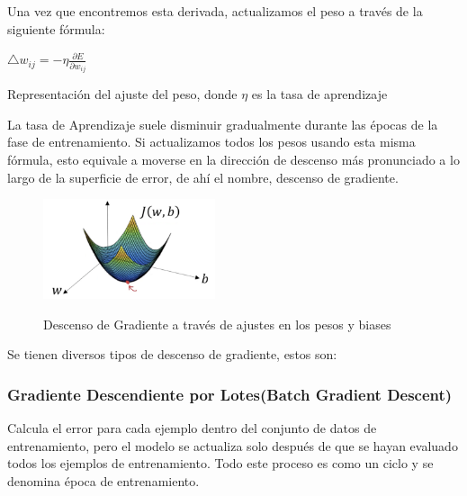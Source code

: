 		Una vez que encontremos esta derivada, actualizamos el peso a través de la siguiente fórmula:

		\begingroup\makeatletter{}\check@mathfonts
		\begin{center}
		$  \triangle w_{ij} = -\eta\frac{{\partial E}}{\partial w_{ij}} $
		\end{center}
		\begin{center}
		{\small{Representación del ajuste del peso, donde $\eta$ es la tasa de aprendizaje}}
		\end{center}
		\endgroup

		La tasa de Aprendizaje suele disminuir gradualmente durante las épocas de la fase de entrenamiento. Si actualizamos todos los pesos usando esta misma fórmula, esto equivale a moverse en la dirección de descenso más pronunciado a lo largo de la superficie de error, de ahí el nombre, descenso de gradiente.
		\begin{figure}[H]
		\begin{center}
		\includegraphics[width=0.45\textwidth]{images/desarrollo/entrenamiento/gradient}
		\end{center}
		\begin{center}
		\caption{\small{Descenso de Gradiente a través de ajustes en los pesos y biases}}
		\vspace{-0.5em}
		{\small{\cite{gradientimg}}}
		\end{center}
		\vspace{-1.5em}
		\end{figure}

		Se tienen diversos tipos de descenso de gradiente, estos son:
		\subsubsection{Gradiente Descendiente por Lotes(Batch Gradient Descent)}
		
			Calcula el error para cada ejemplo dentro del conjunto de datos de entrenamiento, pero el modelo se actualiza solo después de que se hayan evaluado todos los ejemplos de entrenamiento. Todo este proceso es como un ciclo y se denomina época de entrenamiento.

